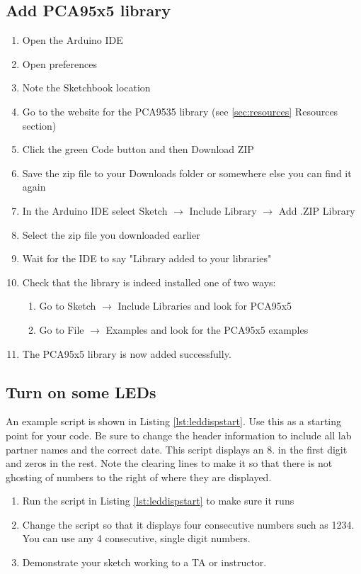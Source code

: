\subsection{Add PCA95x5 library}
\begin{enumerate}
    \item Open the Arduino IDE 
    \item Open preferences
    \item Note the Sketchbook location 
    \item Go to the website for the PCA9535 library (see \ref{sec:resources} Resources section)
    \item Click the green Code button and then Download ZIP
    \item Save the zip file to your Downloads folder or somewhere else you can find it again
    \item In the Arduino IDE select Sketch $\rightarrow$ Include Library $\rightarrow$ Add .ZIP Library
    \item Select the zip file you downloaded earlier
    \item Wait for the IDE to say "Library added to your libraries"
    \item Check that the library is indeed installed one of two ways:
    \begin{enumerate}
        \item Go to Sketch $\rightarrow$ Include Libraries and look for PCA95x5
        \item Go to File $\rightarrow$ Examples and look for the PCA95x5 examples
    \end{enumerate}
    \item The PCA95x5 library is now added successfully.
\end{enumerate}

\subsection{Turn on some LEDs}
An example script is shown in Listing \ref{lst:leddispstart}. Use this as a starting point for your
code. Be sure to change the header information to include all lab partner names and the correct 
date. This script displays an 8. in the first digit and zeros in the rest. Note the clearing
lines to make it so that there is not ghosting of numbers to the right of where they are displayed.

\begin{enumerate}
    \item Run the script in Listing \ref{lst:leddispstart} to make sure it runs
    \item Change the script so that it displays four consecutive numbers such as 1234. You can use
            any 4 consecutive, single digit numbers.
    \item Demonstrate your sketch working to a TA or instructor.
\end{enumerate}

